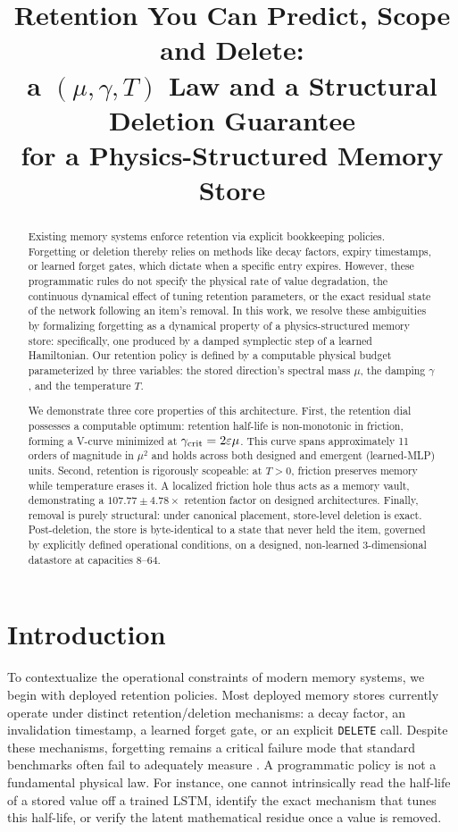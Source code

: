 \documentclass{article}
\title{Retention You Can Predict, Scope and Delete:\\ a $(\mu,\gamma,T)$ Law and a Structural Deletion Guarantee\\ for a Physics-Structured Memory Store}
\begin{document}
\maketitle
\begin{abstract}
Existing memory systems enforce retention via explicit bookkeeping policies. Forgetting or deletion thereby relies on methods like decay factors, expiry timestamps, or learned forget gates, which dictate when a specific entry expires.
However, these programmatic rules do not specify the physical rate of value degradation, the continuous dynamical effect of tuning retention parameters, or the exact residual state of the network following an item's removal.
In this work, we resolve these ambiguities by formalizing forgetting as a dynamical property of a physics-structured memory store: specifically, one produced by a damped symplectic step of a learned Hamiltonian. Our retention policy is defined by a computable physical budget parameterized by three variables: the stored direction's spectral mass $\mu$, the damping $\gamma$, and the temperature $T$.

We demonstrate three core properties of this architecture. First, the retention dial possesses a computable optimum: retention half-life is non-monotonic in friction, forming a V-curve minimized at $\gamma_{\rm crit}=2\varepsilon\mu$. This curve spans approximately 11 orders of magnitude in $\mu^2$ and holds across both designed and emergent (learned-MLP) units. Second, retention is rigorously scopeable: at $T>0$, friction preserves memory while temperature erases it. A localized friction hole thus acts as a memory vault, demonstrating a $107.77\pm4.78\times$ retention factor on designed architectures. Finally, removal is purely structural: under canonical \citet{blelloch_strongly_2007} placement, store-level deletion is exact. Post-deletion, the store is byte-identical to a state that never held the item, governed by explicitly defined operational conditions, on a designed, non-learned 3-dimensional datastore at capacities 8--64.
\end{abstract}

\section{Introduction}\label{sec:intro}

To contextualize the operational constraints of modern memory systems, we begin with deployed retention policies. Most deployed memory stores currently operate under distinct retention/deletion mechanisms: a decay factor, an invalidation timestamp, a learned forget gate, or an explicit \texttt{DELETE} call. Despite these mechanisms, forgetting remains a critical failure mode that standard benchmarks often fail to adequately measure \citep{yang_control-plane_2026,uddin_recall_2026}. A programmatic policy is not a fundamental physical law. For instance, one cannot intrinsically read the half-life of a stored value off a trained LSTM, identify the exact mechanism that tunes this half-life, or verify the latent mathematical residue once a value is removed.
\end{document}
